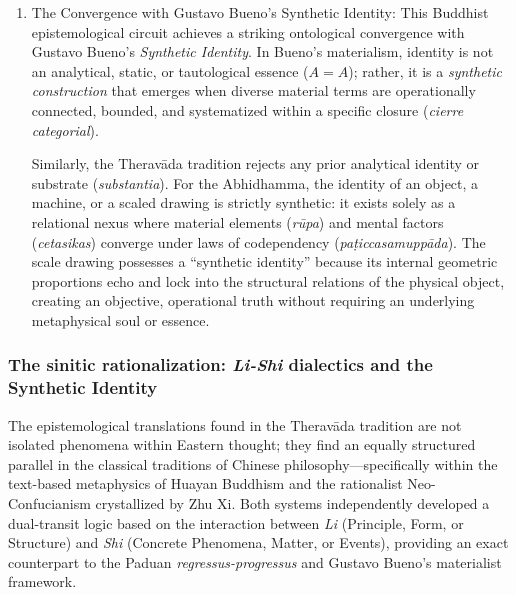\documentclass[11pt, a4paper]{article}
\begin{document}
\begin{enumerate}
	\item \textrm{The Convergence with Gustavo Bueno's Synthetic Identity:} This Buddhist epistemological circuit achieves a striking ontological convergence with Gustavo Bueno's \textit{Synthetic Identity}. In Bueno's materialism, identity is not an analytical, static, or tautological essence ($A = A$); rather, it is a \textit{synthetic construction} that emerges when diverse material terms are operationally connected, bounded, and systematized within a specific closure (\textit{cierre categorial}).

	Similarly, the Theravāda tradition rejects any prior analytical identity or substrate (\textit{substantia}). For the Abhidhamma, the identity of an object, a machine, or a scaled drawing is strictly \textrm{synthetic}: it exists solely as a relational nexus where material elements (\textit{rūpa}) and mental factors (\textit{cetasikas}) converge under laws of codependency (\textit{paṭiccasamuppāda}). The scale drawing possesses a ``synthetic identity'' because its internal geometric proportions echo and lock into the structural relations of the physical object, creating an objective, operational truth without requiring an underlying metaphysical soul or essence.
\end{enumerate}


\subsubsection*{The sinitic rationalization: \textit{Li-Shi} dialectics and the Synthetic Identity}

The epistemological translations found in the Theravāda tradition are not isolated phenomena within Eastern thought; they find an equally structured parallel in the classical traditions of Chinese philosophy---specifically within the text-based metaphysics of \textrm{Huayan Buddhism} and the rationalist Neo-Confucianism crystallized by \textrm{Zhu Xi}. Both systems independently developed a dual-transit logic based on the interaction between \textit{Li} (Principle, Form, or Structure) and \textit{Shi} (Concrete Phenomena, Matter, or Events), providing an exact counterpart to the Paduan \textit{regressus-progressus} and Gustavo Bueno's materialist framework.
\end{document}
